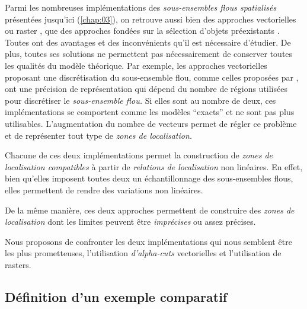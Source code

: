 Parmi les nombreuses implémentations des \emph{sous-ensembles flous
  spatialisés} présentées jusqu'ici (\autoref{chap:03}), on retrouve
aussi bien des approches vectorielles
\autocite{Kanjilal2010,Dilo2007,Zoghlami2016} ou raster
\autocite{Bloch1996}, que des approches fondées sur la sélection
d'objets préexistants \autocite{Duraciova2017}. Toutes ont des
avantages et des inconvénients qu'il est nécessaire d'étudier. De
plus, toutes ses solutions ne permettent pas nécessairement de
conserver toutes les qualités du modèle théorique. Par exemple, les
approches vectorielles proposant une discrétisation du sous-ensemble
flou, comme celles proposées par \textcite{Kanjilal2010,Zoghlami2016},
ont une précision de représentation qui dépend du nombre de régions
utilisées pour discrétiser le \emph{sous-ensemble flou.} Si elles sont
au nombre de deux, ces implémentations se comportent comme les modèles
\enquote{exacts} et ne sont pas plus utilisables. L'augmentation du
nombre de vecteurs permet de régler ce problème et de représenter tout
type de \emph{zones de localisation.}



Chacune de ces deux implémentations permet la construction de
\emph{zones de localisation compatibles} à partir de \emph{relations
  de localisation} non linéaires. En effet, bien qu'elles imposent
toutes deux un échantillonnage des sous-ensembles flous, elles
permettent de rendre des variations non linéaires.

De la même manière, ces deux approches permettent de construire des
\emph{zones de localisation} dont les limites peuvent être
\emph{imprécises} ou assez précises.


Nous proposons de confronter les deux implémentations qui nous
semblent être les plus prometteuses, l'utilisation \emph{d'alpha-cuts}
vectorielles et l'utilisation de rasters.

\subsection{Définition d'un exemple comparatif}

